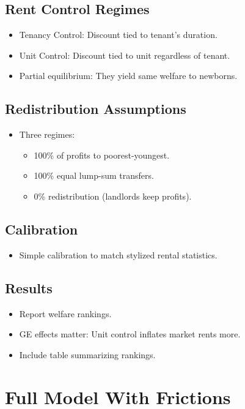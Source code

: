 \documentclass[11pt]{article}
\begin{document}
\subsection{Rent Control Regimes}
\begin{itemize}[leftmargin=*]
    \item Tenancy Control: Discount tied to tenant’s duration.
    \item Unit Control: Discount tied to unit regardless of tenant.
    \item Partial equilibrium: They yield same welfare to newborns.
\end{itemize}

\subsection{Redistribution Assumptions}
\begin{itemize}[leftmargin=*]
    \item Three regimes:
    \begin{itemize}
        \item 100\% of profits to poorest-youngest.
        \item 100\% equal lump-sum transfers.
        \item 0\% redistribution (landlords keep profits).
    \end{itemize}
\end{itemize}

\subsection{Calibration}
\begin{itemize}[leftmargin=*]
    \item Simple calibration to match stylized rental statistics.
\end{itemize}

\subsection{Results}
\begin{itemize}[leftmargin=*]
    \item Report welfare rankings.
    \item GE effects matter: Unit control inflates market rents more.
    \item Include table summarizing rankings.
\end{itemize}

\section{Full Model With Frictions}
\end{document}
